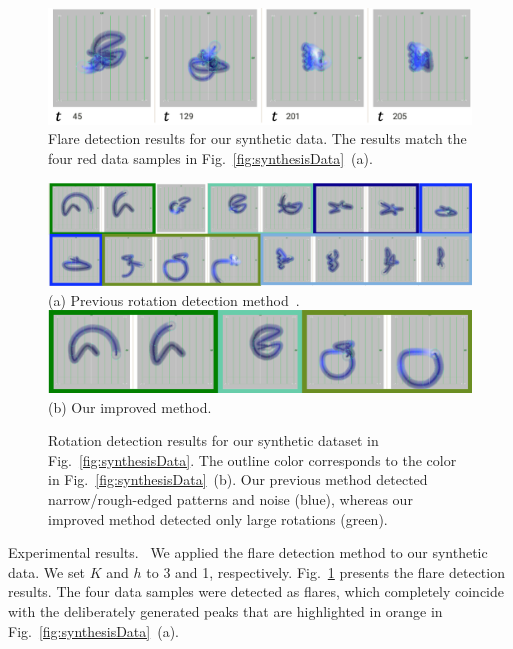 \begin{figure}[tb]
    \centering
    \includegraphics[width=.85\linewidth]{figures/flareDetectiondemodataResults.png}
    \caption{Flare detection results for our synthetic data. The results match the four red data samples in Fig.~\ref{fig:synthesisData}~(a).}
    \label{fig:flareDetection}
\end{figure}
\begin{figure}[tb]
    \centering
    \includegraphics[width=\linewidth]{figures/rotationDetectiondemodataResultsOR.png}\\
    \footnotesize{\sf(a) Previous rotation detection method~\cite{Fujishiro2018}.}\\
    \vspace{5px}
    \includegraphics[width=.8\linewidth]{figures/rotationDetectiondemodataResults.png}\\
    \footnotesize{\sf(b) Our improved method.}
    \caption{Rotation detection results for our synthetic dataset in Fig.~\ref{fig:synthesisData}. 
        The outline color corresponds to the color in Fig.~\ref{fig:synthesisData}~(b).
        Our previous method detected narrow/rough-edged patterns and noise (blue), 
        whereas our improved method detected only large rotations (green).}
    \label{fig:rotationResults}
\end{figure}

\textsf{Experimental results.\ } We applied the flare detection method to our synthetic data.
We set $K$ and $h$ to 3 and 1, respectively.
Fig.~\ref{fig:flareDetection} presents the flare detection results.
The four data samples were detected as flares,
which completely coincide with the deliberately generated peaks that are highlighted in orange in Fig.~\ref{fig:synthesisData}~(a).

